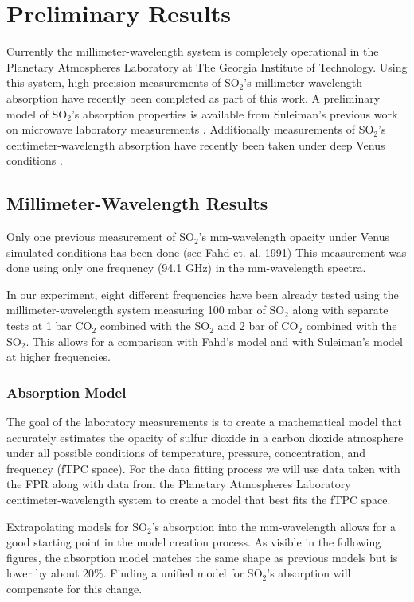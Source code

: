 \section{Preliminary Results}

Currently the millimeter-wavelength system is completely operational in the Planetary Atmospheres Laboratory at The Georgia Institute of Technology. Using this system, high precision measurements of SO$_2$'s millimeter-wavelength absorption have recently been completed as part of this work. A preliminary model of SO$_2$'s absorption properties is available from Suleiman's previous work on microwave laboratory measurements \cite{Suleiman-thesis}. Additionally measurements  of SO$_2$'s centimeter-wavelength absorption have recently been taken under deep Venus conditions \cite{so2-cent-lab} \cite{so2-cent-model}. 

\subsection{Millimeter-Wavelength Results}

Only one previous measurement of SO$_2$'s mm-wavelength opacity under Venus simulated conditions has been done (see Fahd et. al. 1991) \cite{fahd-so2} This measurement was done using only one frequency (94.1 GHz) in the mm-wavelength spectra.

In our experiment, eight different frequencies have been already tested using the millimeter-wavelength system measuring 100 mbar of SO$_2$ along with separate tests at 1 bar CO$_2$ combined with the SO$_2$  and 2 bar of CO$_2$ combined with the SO$_2$. This allows for a comparison with Fahd's model and with Suleiman's model at higher frequencies.  

\subsubsection{Absorption Model}

The goal of the laboratory measurements is to create a mathematical model that accurately estimates the opacity of sulfur dioxide in a carbon dioxide atmosphere under all possible conditions of temperature, pressure, concentration, and frequency (fTPC space). For the data fitting process we will use data taken with the FPR along with data from the Planetary Atmospheres Laboratory centimeter-wavelength system  \cite{so2-cent-lab} \cite{so2-cent-model} to create a model that best fits the fTPC space. 

Extrapolating models for SO$_2$'s absorption into the mm-wavelength allows for a good starting point in the model creation process. As visible in the following figures, the absorption model matches the same shape as previous models but is lower by about 20\%. Finding a unified model for SO$_2$'s absorption will compensate for this change.

